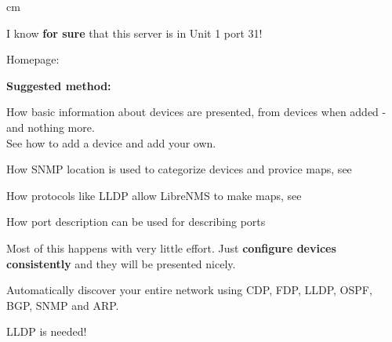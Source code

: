 \documentclass[Screen16to9,17pt]{foils}
\begin{document}
 cm
\centerline{I know {\bf for sure} that this server is in Unit 1 port 31!}




\begin{list2}
\item Homepage: 
\item {\bf Suggested method:}
\item How basic information about devices are presented, from devices when added - and nothing more.\\
See how to add a device and add your own. 
\item How SNMP location is used to categorize devices and provice maps, see\\
\item How protocols like LLDP allow LibreNMS to make maps, see\\
\item How port description can be used for describing ports\\
\end{list2}

Most of this happens with very little effort. Just {\bf configure devices consistently} and they will be presented nicely.





Automatically discover your entire network using CDP, FDP, LLDP,
OSPF, BGP, SNMP and ARP.



\centerline{LLDP is needed!}




\end{document}
